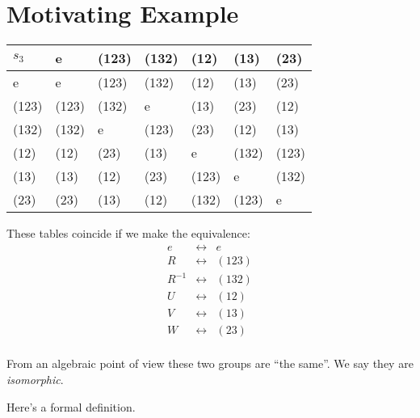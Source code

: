 \documentclass{article}
\theoremstyle{definition}
\begin{document}
\section{Motivating Example}

\begin{table}[h]
\centering
\begin{tabular}{l|llllll}
$s_3$  & e     & (123) & (132) & (12)  & (13)  & (23)  \\
\hline
e     & e     & (123) & (132) & (12)  & (13)  & (23)   \\
(123) & (123) & (132) & e     & (13)  & (23)  & (12)   \\
(132) & (132) & e     & (123) & (23)  & (12)  & (13)   \\
(12)  & (12)  & (23)  & (13)  & e     & (132) & (123)  \\
(13)  & (13)  & (12)  & (23)  & (123) & e     & (132)  \\
(23)  & (23)  & (13)  & (12)  & (132) & (123) & e      \\
\end{tabular}
\end{table}

These tables coincide if we make the equivalence:
$$ 
\begin{matrix}
  e & \leftrightarrow & e \\
  R & \leftrightarrow & (123) \\
  R^{-1} & \leftrightarrow & (132) \\
  U & \leftrightarrow & (12) \\
  V & \leftrightarrow & (13) \\
  W & \leftrightarrow & (23) \\
\end{matrix}
$$



From an algebraic point of view these two groups are ``the same''. We say they are \textit{isomorphic}.

Here's a formal definition.\\
\end{document}
